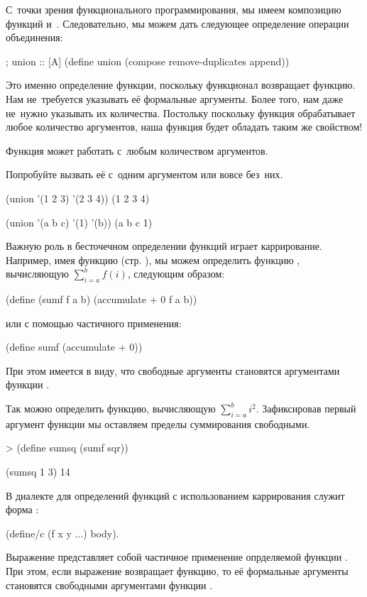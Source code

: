 \noindent С~точки зрения функционального программирования, мы имеем композицию функций  и~. Следовательно, мы можем дать следующее определение операции объединения:

\begin{Definition}
; union :: [A] \ddd \arrow [A]
(define union (compose remove-duplicates append))
\end{Definition}

Это именно определение функции, поскольку функционал  возвращает функцию. Нам не~требуется указывать её формальные аргументы. Более того, нам даже не~нужно указывать их количества. Постольку поскольку функция  обрабатывает любое количество аргументов, наша функция  будет обладать таким же свойством!

\begin{example}{Функция  может работать с~любым количеством аргументов.

Попробуйте вызвать её с~одним аргументом или вовсе без~них.}
\REPL
  {(union '(1 2 3) '(2 3 4))}
  {(1 2 3 4)}

\REPL
  {(union '(a b c) '(1) '(b))}
  {(a b c 1)} 
\end{example}

Важную роль в бесточечном определении функций играет каррирование. Например, имея функцию  (стр. \pageref{accumulate}), мы можем определить функцию , вычисляющую $\sum_{i=a}^b f(i)$,  следующим образом:
\begin{SchemeCode}[emph={f,a,b}]
  (define (sumf f a b) (accumulate + 0 f a b))
\end{SchemeCode}
или с помощью частичного применения:
\begin{SchemeCode}
  (define sumf (accumulate + 0))
\end{SchemeCode}
При этом имеется в виду, что свободные аргументы  становятся аргументами функции .

Так можно определить функцию, вычисляющую $\sum_{i=a}^b i^2$. Зафиксировав первый аргумент функции  мы оставляем пределы суммирования свободными.
\begin{SchemeCode}
   > (define sumsq (sumf sqr))
\end{SchemeCode}
\REPL
  {(sumsq 1 3)}
  {14} 

В диалекте \FLP для определений функций с использованием каррирования служит форма :\label{define-c} 
\begin{SchemeCode}
(define/c (f x y ...) body).
\end{SchemeCode}
Выражение  представляет собой частичное применение опрделяемой функции . При этом, если выражение  возвращает функцию, то её формальные аргументы становятся свободными аргументами функции .

